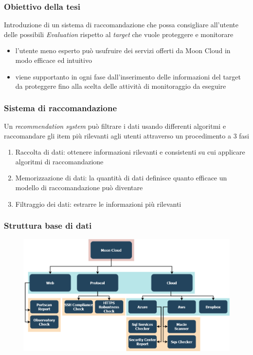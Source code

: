 \begin{frame}
    \frametitle{Obiettivo della tesi}
    Introduzione di un \alert{sistema di raccomandazione} che possa consigliare all'utente delle possibili \textit{Evaluation} rispetto 
    al \textit{target} che vuole proteggere e monitorare
    \begin{itemize}
        \item l'utente meno esperto può usufruire dei servizi offerti da Moon Cloud in modo \alert{efficace} ed \alert{intuitivo} 
        \item viene supportanto in ogni fase dall'inserimento delle informazioni del target da proteggere fino alla scelta delle 
        attività di monitoraggio da eseguire
    \end{itemize}
\end{frame}

\begin{frame}
    \frametitle{Sistema di raccomandazione}
    Un \textit{recommendation system} può filtrare i dati usando differenti algoritmi e raccomandare gli item più rilevanti agli utenti attraverso 
    un procedimento a 3 fasi
    \begin{enumerate}
        \item \alert{Raccolta di dati}: ottenere informazioni rilevanti e consistenti su cui applicare algoritmi di raccomandazione
        \item \alert{Memorizzazione di dati}: la quantità di dati definisce quanto efficace un modello di raccomandazione può diventare
        \item \alert{Filtraggio dei dati}: estrarre le informazioni più rilevanti
    \end{enumerate}
\end{frame}

\begin{frame}
    \frametitle{Struttura base di dati}
    \begin{figure}
        \centering
        \includegraphics[scale=0.35]{images/MC_Rec_Tree2}
    \end{figure}
\end{frame}

